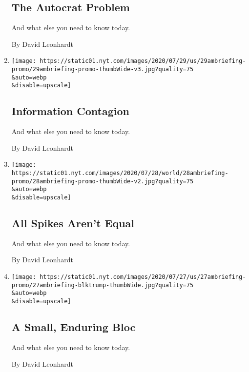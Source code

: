 \begin{enumerate}
  \hypertarget{the-autocrat-problem}{%
  \subsection{The Autocrat Problem}\label{the-autocrat-problem}}

  And what else you need to know today.

  By David Leonhardt
\item
  \href{/2020/07/29/briefing/coronavirus-william-barr-emmy-nominations-your-wednesday-briefing.html}{}

  \texttt{[image: https://static01.nyt.com/images/2020/07/29/us/29ambriefing-promo/29ambriefing-promo-thumbWide-v3.jpg?quality=75\\\&auto=webp\\\&disable=upscale]}

  \hypertarget{information-contagion}{%
  \subsection{Information Contagion}\label{information-contagion}}

  And what else you need to know today.

  By David Leonhardt
\item
  \href{/2020/07/28/briefing/william-barr-mlb-john-lewis.html}{}

  \texttt{[image: https://static01.nyt.com/images/2020/07/28/world/28ambriefing-promo/28ambriefing-promo-thumbWide-v2.jpg?quality=75\\\&auto=webp\\\&disable=upscale]}

  \hypertarget{all-spikes-arent-equal}{%
  \subsection{All Spikes Aren't Equal}\label{all-spikes-arent-equal}}

  And what else you need to know today.

  By David Leonhardt
\item
  \href{/2020/07/27/briefing/john-lewis-portland-coronavirus.html}{}

  \texttt{[image: https://static01.nyt.com/images/2020/07/27/us/27ambriefing-promo/27ambriefing-blktrump-thumbWide.jpg?quality=75\\\&auto=webp\\\&disable=upscale]}

  \hypertarget{a-small-enduring-bloc}{%
  \subsection{A Small, Enduring Bloc}\label{a-small-enduring-bloc}}

  And what else you need to know today.

  By David Leonhardt
\end{enumerate}

